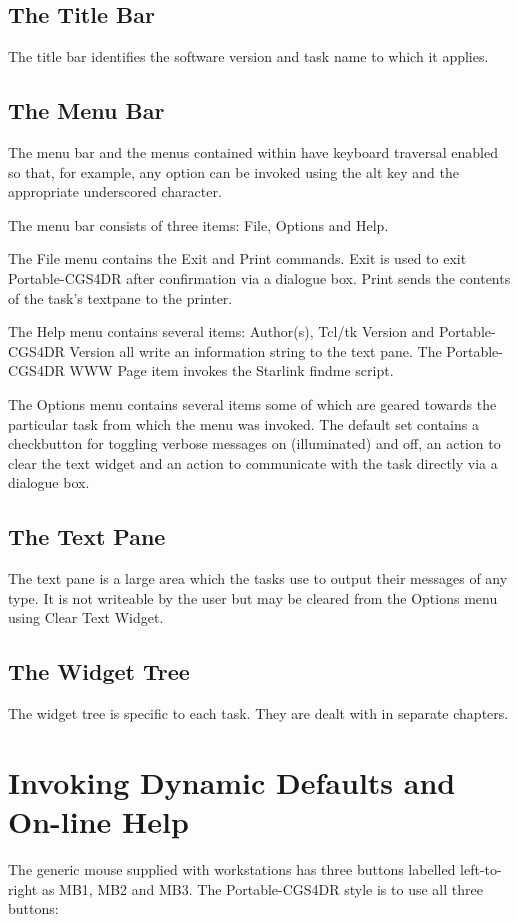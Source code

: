 \documentclass[a4paper]{book}
\renewcommand{\_}{{\tt\char'137}}
\begin{document}
\subsection{The Title Bar}
The title bar identifies the software version and task name to which it applies.

\subsection{The Menu Bar}
The menu bar and the menus contained within have keyboard traversal enabled so that, for example, any option
can be invoked using the {\sc alt} key and the appropriate underscored character.

The menu bar consists of three items: {\sf File}, {\sf Options} and {\sf Help}. 

The {\sf File} menu contains the {\sf Exit} and {\sf Print} commands. {\sf Exit} is used to exit Portable-CGS4DR after confirmation
via a dialogue box. {\sf Print} sends the contents of the task's textpane to the printer.

The {\sf Help} menu contains several items: {\sf Author(s)}, {\sf Tcl/tk Version} and {\sf Portable-CGS4DR Version} 
all write an information string to the text pane. The {\sf Portable-CGS4DR WWW Page} item invokes the Starlink findme script.

The {\sf Options} menu contains several items some of which are geared towards the particular task from
which the menu was invoked. The default set contains a checkbutton for toggling verbose messages on (illuminated)
and off, an action to clear the text widget and an action to communicate with the task directly via a dialogue box.

\subsection{The Text Pane}
The text pane is a large area which the tasks use to output their
messages of any type. It is not writeable by the user but may be
cleared from the {\sf Options} menu using {\sf Clear Text Widget}.

\subsection{The Widget Tree}
The widget tree is specific to each task. They are dealt with in separate chapters.

\section{Invoking Dynamic Defaults and On-line Help}
The generic mouse supplied with workstations has three buttons labelled
left-to-right as MB1, MB2 and MB3. The Portable-CGS4DR style is to use
all three buttons:
\end{document}
